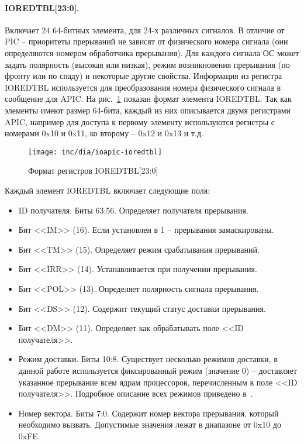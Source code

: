 \paragraph{IOREDTBL[23:0].} Включает 24 64-битных элемента, для 24-х различных сигналов. В отличие от PIC -- приоритеты
прерываний не зависят от физического номера сигнала (они определяются номером обработчика прерывания). Для каждого
сигнала ОС может задать полярность (высокая или низкая), режим возникновения прерывания (по фронту или по спаду) и некоторые
другие свойства. Информация из регистра IOREDTBL используется для преобразования номера физического сигнала в сообщение для
APIC. На рис.~\ref{fig:ioapic-ioredtbl} показан формат элемента IOREDTBL. Так как элементы имеют размер 64-бита, каждый
из них описывается двумя регистрами APIC, например для доступа к первому элементу используются регистры с номерами 0x10 и 0x11,
ко второму -- 0x12 и 0x13 и т.д.

\begin{figure}[ht!]
  \centering
  \texttt{[image: inc/dia/ioapic-ioredtbl]}
  \caption{Формат регистров IOREDTBL[23:0]}
  \label{fig:ioapic-ioredtbl}
\end{figure}

Каждый элемент IOREDTBL включает следующие поля:
\begin{itemize}
\item ID получателя. Биты 63:56. Определяет получателя прерывания.
\item Бит <<IM>> (16). Если установлен в 1 -- прерывания замаскированы.
\item Бит <<TM>> (15). Определяет режим срабатывания прерываний.
\item Бит <<IRR>> (14). Устанавливается при получении прерывания.
\item Бит <<POL>> (13). Определяет полярность сигнала прерывания.
\item Бит <<DS>> (12). Содержит текущий статус доставки прерывания.
\item Бит <<DM>> (11). Определяет как обрабатывать поле <<ID получателя>>.
\item Режим доставки. Биты 10:8. Существует несколько режимов доставки, в данной работе используется
	фиксированный режим (значение 0) -- доставляет указанное прерывание всем ядрам процессоров,
	перечисленным в поле <<ID получателя>>. Подробное описание всех режимов приведено в~\cite{ioapic}.
\item Номер вектора. Биты 7:0. Содержит номер вектора прерывания, который необходимо вызвать.
	Допустимые значения лежат в диапазоне от 0x10 до 0xFE.
\end{itemize}


